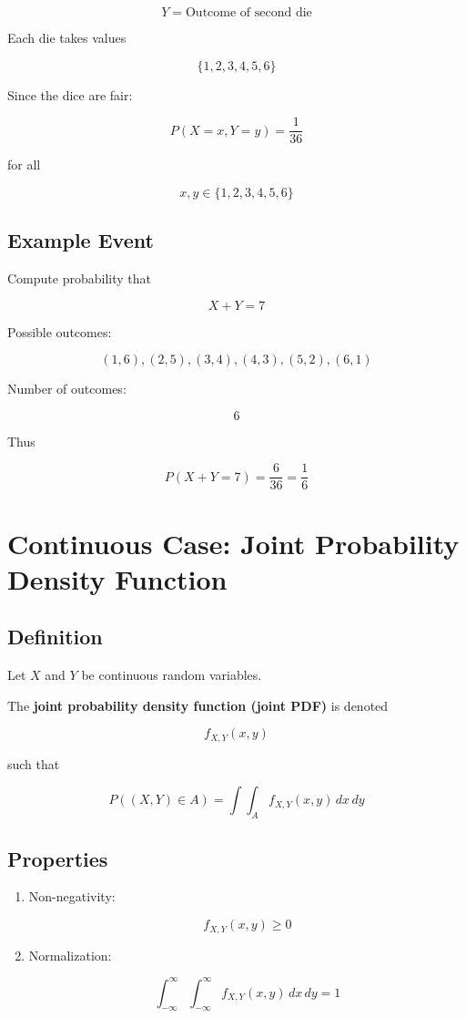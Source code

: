 \documentclass[11pt]{article}
\begin{document}
\[
Y = \text{Outcome of second die}
\]

Each die takes values

\[
\{1,2,3,4,5,6\}
\]

Since the dice are fair:

\[
P(X=x,Y=y) = \frac{1}{36}
\]

for all

\[
x,y \in \{1,2,3,4,5,6\}
\]

\subsection{Example Event}

Compute probability that

\[
X + Y = 7
\]

Possible outcomes:

\[
(1,6), (2,5), (3,4), (4,3), (5,2), (6,1)
\]

Number of outcomes:

\[
6
\]

Thus

\[
P(X+Y=7) = \frac{6}{36} = \frac{1}{6}
\]

\section{Continuous Case: Joint Probability Density Function}

\subsection{Definition}

Let \(X\) and \(Y\) be continuous random variables.

The \textbf{joint probability density function (joint PDF)} is denoted

\[
f_{X,Y}(x,y)
\]

such that

\[
P((X,Y) \in A) =
\int\int_A f_{X,Y}(x,y)\,dx\,dy
\]

\subsection{Properties}

\begin{enumerate}
\item Non-negativity:

\[
f_{X,Y}(x,y) \ge 0
\]

\item Normalization:

\[
\int_{-\infty}^{\infty}\int_{-\infty}^{\infty} f_{X,Y}(x,y)\,dx\,dy = 1
\]
\end{enumerate}
\end{document}
